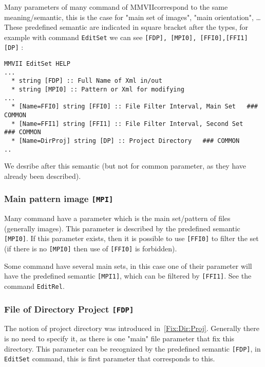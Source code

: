 \documentclass[a4paper]{book}
\newcommand{\PPP}{MMVII}
\begin{document}
Many parameters of many command of \PPP correspond to the same meaning/semantic,
this is  the case for "main set of images", "main orientation", \dots These predefined
semantic are indicated in square bracket after the types, for example with command
{\tt EditSet} we can see {\tt [FDP], [MPI0], [FFI0],[FFI1] [DP]} :


\begin{verbatim}
MMVII EditSet HELP
...
  * string [FDP] :: Full Name of Xml in/out
  * string [MPI0] :: Pattern or Xml for modifying
...
  * [Name=FFI0] string [FFI0] :: File Filter Interval, Main Set   ### COMMON 
  * [Name=FFI1] string [FFI1] :: File Filter Interval, Second Set   ### COMMON 
  * [Name=DirProj] string [DP] :: Project Directory   ### COMMON 
..
\end{verbatim}

We desribe after this semantic (but not for common parameter, as they have already been described).



\subsubsection{Main pattern image {\tt [MPI]}}

Many command have a parameter which is the main set/pattern of files (generally images).
This  parameter is described by the predefined semantic {\tt [MPI0]}. If this
parameter exists, then  it is possible to use {\tt [FFI0]} to filter the set (if there
is no {\tt [MPI0]} then use of {\tt [FFI0]}  is forbidden).

Some command have several main sets, in this case one of their parameter will have
the predefined semantic {\tt [MPI1]}, which can be filtered by {\tt [FFI1]}. See
the command {\tt EditRel}.



\subsubsection{File of Directory Project {\tt [FDP]}}

The notion of project directory was introduced in~\ref{Fix:Dir:Proj}.
Generally there is no need to specify it, as there is one "main" file parameter
that fix this directory. This parameter can be recognized by the predefined
semantic  {\tt [FDP]}, in {\tt EditSet} command, this is first parameter that
corresponds to this.
\end{document}

